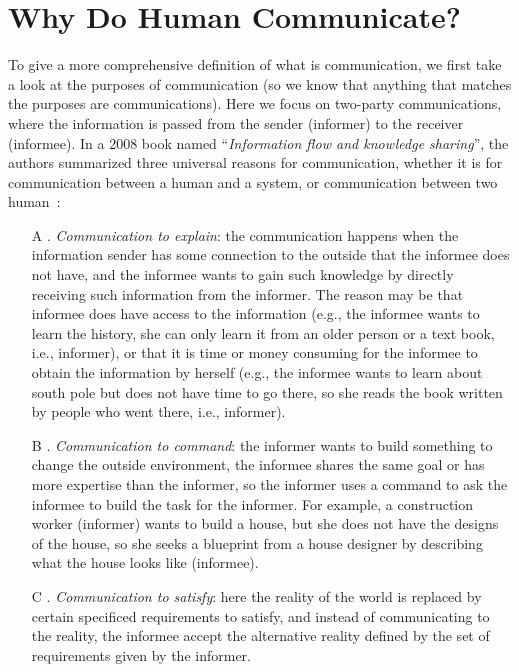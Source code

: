 \section{Why Do Human Communicate?}
\label{sec:ch1:why}

To give a more comprehensive definition of what is communication, we first take a look at the purposes of communication (so we know that anything that matches the purposes are communications). Here we focus on two-party communications, where the information is passed from the sender (informer) to the receiver (informee). In a 2008 book named ``\textit{Information flow and knowledge sharing}'', the authors summarized three universal reasons for communication, whether it is for communication between a human and a system, or communication between two human~\cite{da2008information}:

\begin{enumerate}
	\item[A]. \textit{Communication to explain}: the communication happens when the information sender has some connection to the outside that the informee does not have, and the informee wants to gain such knowledge by directly receiving such information from the informer. The reason may be that informee does have access to the information (e.g., the informee wants to learn the history, she can only learn it from an older person or a text book, i.e., informer), or that it is time or money consuming for the informee to obtain the information by herself (e.g., the informee wants to learn about south pole but does not have time to go there, so she reads the book written by people who went there, i.e., informer). 
	\item[B]. \textit{Communication to command}: the informer wants to build something to change the outside environment, the informee shares the same goal or has more expertise than the informer, so the informer uses a command to ask the informee to build the task for the informer. For example, a construction worker (informer) wants to build a house, but she does not have the designs of the house, so she seeks a blueprint from a house designer by describing what the house looks like (informee). 
	\item[C]. \textit{Communication to satisfy}: here the reality of the world is replaced by certain specificed requirements to satisfy, and instead of communicating to the reality, the informee accept the alternative reality defined by the set of requirements given by the informer. 
\end{enumerate}

